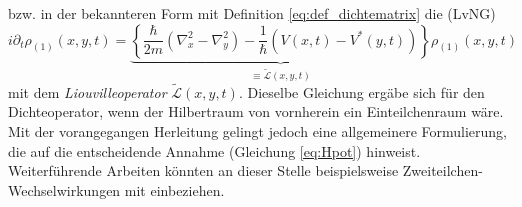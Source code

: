 bzw. in der bekannteren Form mit Definition \eqref{eq:def_dichtematrix} die \lvn (LvNG)
\begin{equation}
  i\partial_t \rho_{(1)}(x,y,t) = \underbrace{\left\{\frac{\hbar}{2m}(\nabla_x^2 - \nabla_y^2) - \frac{1}{\hbar}(V(x,t) - V^*(y,t)) \right\}}_{\equiv{\tilde{\mathcal{L}}(x,y,t)}} \rho_{(1)}(x,y,t)
  \label{eq:lvn_first}
\end{equation}
mit dem \emph{Liouvilleoperator} $\tilde{\mathcal{L}}(x,y,t)$. Dieselbe Gleichung ergäbe sich für den Dichteoperator, wenn der Hilbertraum von vornherein ein Einteilchenraum wäre. Mit der vorangegangen Herleitung gelingt jedoch eine allgemeinere Formulierung, die auf die entscheidende Annahme (Gleichung \eqref{eq:Hpot}) hinweist. Weiterführende Arbeiten könnten an dieser Stelle beispielsweise Zweiteilchen-Wechselwirkungen mit einbeziehen.

